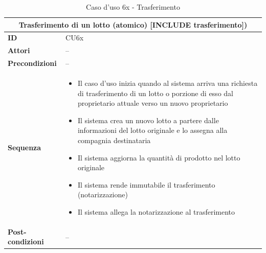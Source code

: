 \documentclass[a4paper,11pt]{article}
\begin{document}
\begin{table}[H]
  \centering
  \begin{tabular}{|m{2cm}|m{10.5cm}|}
    \hline
    \multicolumn{2}{|c|}{\textbf{Trasferimento di un lotto (atomico) [INCLUDE trasferimento])}} \\ \hline
    \multicolumn{1}{|l|}{\textbf{ID}}              & CU6x                                       \\ \hline
    \multicolumn{1}{|l|}{\textbf{Attori}}          & --                                         \\ \hline
    \multicolumn{1}{|l|}{\textbf{Precondizioni}}   & --                                         \\ \hline
    \multicolumn{1}{|l|}{\textbf{Sequenza}}        &

    \begin{itemize}
      \item Il caso d'uso inizia quando al sistema arriva una richiesta di trasferimento di un lotto o porzione di esso dal proprietario attuale verso un nuovo proprietario
      \item Il sistema crea un nuovo lotto a partere dalle informazioni del lotto originale e lo assegna alla compagnia destinataria
      \item Il sistema aggiorna la quantità di prodotto nel lotto originale
      \item Il sistema rende immutabile il trasferimento (notarizzazione)
      \item Il sistema allega la notarizzazione al trasferimento

    \end{itemize}

    \\ \hline
    \multicolumn{1}{|l|}{\textbf{Post-condizioni}} &
    --
    \\ \hline
  \end{tabular}
  \caption{Caso d'uso 6x - Trasferimento}
  \label{cu:CU6x}
\end{table}
\end{document}
